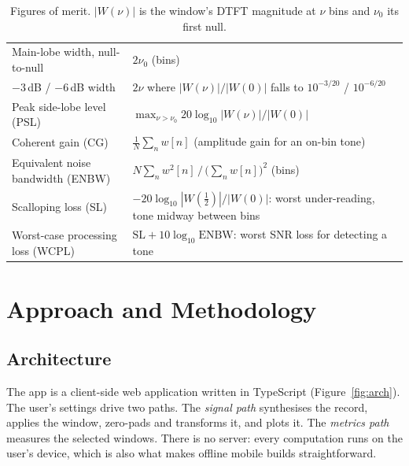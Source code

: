 \documentclass[11pt,a4paper]{article}
\begin{document}
\begin{table}[htbp]
  \centering\small
  \caption{Figures of merit. $|W(\nu)|$ is the window's DTFT magnitude at $\nu$ bins and
  $\nu_0$ its first null.}
  \label{tab:defs}
  \begin{tabularx}{\linewidth}{lY}
    \hline
    Main-lobe width, null-to-null & $2\nu_0$ (bins) \\
    $-3$\,dB / $-6$\,dB width & $2\nu$ where $|W(\nu)|/|W(0)|$ falls to $10^{-3/20}$ / $10^{-6/20}$ \\
    Peak side-lobe level (PSL) & $\max_{\nu>\nu_0} 20\log_{10}|W(\nu)|/|W(0)|$ \\
    Coherent gain (CG) & $\frac{1}{N}\sum_n w[n]$ (amplitude gain for an on-bin tone) \\
    Equivalent noise bandwidth (ENBW) & $N\sum_n w^2[n]\,/\,\big(\sum_n w[n]\big)^2$ (bins) \\
    Scalloping loss (SL) & $-20\log_{10}|W(\tfrac12)|/|W(0)|$: worst under-reading, tone midway between bins \\
    Worst-case processing loss (WCPL) & $\mathrm{SL}+10\log_{10}\mathrm{ENBW}$: worst SNR loss for detecting a tone \\
    \hline
  \end{tabularx}
\end{table}

\section{Approach and Methodology}

\subsection{Architecture}
The app is a client-side web application written in TypeScript (Figure~\ref{fig:arch}). The
user's settings drive two paths. The \emph{signal path} synthesises the record, applies the
window, zero-pads and transforms it, and plots it. The \emph{metrics path} measures the
selected windows. There is no server: every computation runs on the user's device, which is
also what makes offline mobile builds straightforward.
\end{document}
